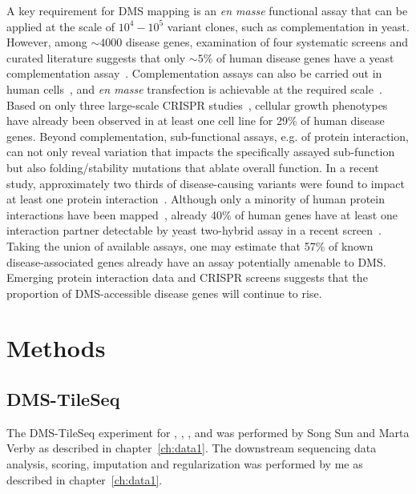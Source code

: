 A key requirement for DMS mapping is an \textit{en masse} functional assay that can be applied at the scale of $10^4-10^5$ variant clones, such as complementation in yeast.  However, among $\sim 4000$ disease genes, examination of four systematic screens and curated literature suggests that only $\sim 5\%$ of human disease genes have a yeast complementation assay~\cite{hamza_complementation_2015,kachroo_systematic_2015,sun_extended_2016}. Complementation assays can also be carried out in human cells~\cite{wagenaar_resistance_2014}, and \textit{en masse} transfection is achievable at the required scale~\cite{blomen_gene_2015}. Based on only three large-scale CRISPR studies~\cite{hart_high-resolution_2015,blomen_gene_2015,wang_genetic_2014}, cellular growth phenotypes have already been observed in at least one cell line for 29\% of human disease genes.  Beyond complementation, sub-functional assays, e.g. of protein interaction, can not only reveal variation that impacts the specifically assayed sub-function but also folding/stability mutations that ablate overall function. In a recent study, approximately two thirds of disease-causing variants were found to impact at least one protein interaction~\cite{sahni_widespread_2015}. Although only a minority of human protein interactions have been mapped~\cite{rolland_proteome-scale_2014}, already 40\% of human genes have at least one interaction partner detectable by yeast two-hybrid assay in a recent screen~\cite{rolland_proteome-scale_2014}. Taking the union of available assays, one may estimate that 57\% of known disease-associated genes already have an assay potentially amenable to DMS. Emerging protein interaction data and CRISPR screens suggests that the proportion of DMS-accessible disease genes will continue to rise. 

\section{Methods}

\subsection{DMS-TileSeq}
The DMS-TileSeq experiment for , , , and  was performed by Song Sun and Marta Verby as described in chapter~\ref{ch:data1}. The downstream sequencing data analysis, scoring, imputation and regularization was performed by me as described in chapter~\ref{ch:data1}.

